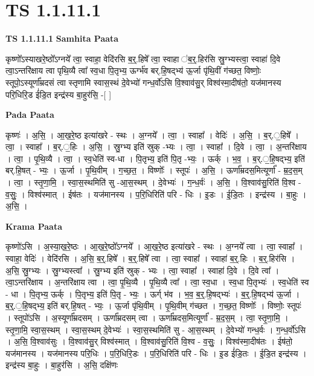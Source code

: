 \documentclass[17pt]{extarticle}
\begin{document}
\section{ TS 1.1.11.1 }

\textbf{TS 1.1.11.1 } \newline
\textbf{Samhita Paata} \newline

कृष्णो᳚ऽस्याखरे॒ष्ठो᳚ऽग्नये᳚ त्वा॒ स्वाहा॒ वेदि॑रसि ब॒र्॒.हिषे᳚ त्वा॒ स्वाहा ॑ब॒र्॒.हिर॑सि स्रु॒ग्भ्यस्त्वा॒ स्वाहा॑ दि॒वे त्वा॒ऽन्तरि॑क्षाय त्वा पृथि॒व्यै त्वा᳚ स्व॒धा पि॒तृभ्य॒ ऊर्ग्भ॑व बर्.हि॒षद्भ्य॑  ऊ॒र्जा पृ॑थि॒वीं ग॑च्छत॒ विष्णोः॒ स्तूपो॒ऽस्यूर्णा᳚म्रदसं त्वा स्तृणामि स्वास॒स्थं दे॒वेभ्यो॑ गन्ध॒र्वो॑ऽसि वि॒श्वाव॑सु॒र् विश्व॑स्मा॒दीष॑तो॒ यज॑मानस्य परि॒धिरि॒ड ई॑डि॒त इन्द्र॑स्य बा॒हुर॑सि॒ -[ ] \newline

\textbf{Pada Paata} \newline

कृष्णः॑ । अ॒सि॒ । आ॒ख॒रे॒ष्ठ इत्या॑खरे - स्थः । अ॒ग्नये᳚ । त्वा॒ । स्वाहा᳚ । वेदिः॑ । अ॒सि॒ । ब॒र्.॒हिषे᳚ । त्वा॒ । स्वाहा᳚ । ब॒र्.॒हिः । अ॒सि॒ । स्रु॒ग्भ्य इति॑ स्रुक् -भ्यः । त्वा॒ । स्वाहा᳚ । दि॒वे । त्वा॒ । अ॒न्तरि॑क्षाय । त्वा॒ । पृ॒थि॒व्यै । त्वा॒ । स्व॒धेति॑ स्व-धा । पि॒तृभ्य॒ इति॑ पि॒तृ -भ्यः॒ । ऊर्क् । भ॒व॒ । ब॒र्.॒हि॒षद्भ्य॒ इति॑ बर्.हि॒षत् - भ्यः॒ । ऊ॒र्जा । पृ॒थि॒वीम् । ग॒च्छ॒त॒ । विष्णोः᳚ । स्तूपः॑ । अ॒सि॒ । ऊर्णा᳚म्रदस॒मित्यूर्णा᳚ - म्र॒द॒स॒म् । त्वा॒ । स्तृ॒णा॒मि॒ । स्वा॒स॒स्थमिति॑ सु -आ॒स॒स्थम् । दे॒वेभ्यः॑ । ग॒न्ध॒र्वः॑ । अ॒सि॒ । वि॒श्वाव॑सु॒रिति॑ वि॒श्व - व॒सुः॒ । विश्व॑स्मात् । ईष॑तः । यज॑मानस्य । प॒रि॒धिरिति॑ परि - धिः । इ॒डः । ई॒डि॒तः । इन्द्र॑स्य । बा॒हुः । अ॒सि॒ ।  \newline


\textbf{Krama Paata} \newline

कृष्णो॑ऽसि । अ॒स्या॒ख॒रे॒ष्ठः । आ॒ख॒रे॒ष्ठो᳚ऽग्नये᳚ । आ॒ख॒रे॒ष्ठ इत्या॑खरे - स्थः । अ॒ग्नये᳚ त्वा । त्वा॒ स्वाहा᳚ । स्वाहा॒ वेदिः॑ । वेदि॑रसि । अ॒सि॒ ब॒र्॒.हिषे᳚ । ब॒र्॒.हिषे᳚ त्वा । त्वा॒ स्वाहा᳚ । स्वाहा॑ ब॒र्॒.हिः । ब॒र्॒.हिर॑सि । अ॒सि॒ स्रु॒ग्भ्यः । स्रु॒ग्भ्यस्त्वा᳚ । स्रु॒ग्भ्य इति॑ स्रुक् - भ्यः । त्वा॒ स्वाहा᳚ । स्वाहा॑ दि॒वे । दि॒वे त्वा᳚ । त्वा॒ऽन्तरि॑क्षाय । अ॒न्तरि॑क्षाय त्वा । त्वा॒ पृ॒थि॒व्यै । पृ॒थि॒व्यै त्वा᳚ । त्वा॒ स्व॒धा । स्व॒धा पि॒तृभ्यः॑ । स्व॒धेति॑ स्व - धा । पि॒तृभ्य॒ ऊर्क् । पि॒तृभ्य॒ इति॑ पि॒तृ - भ्यः॒ । ऊर्ग् भ॑व । भ॒व॒ ब॒॒र्॒.हि॒षद्भ्यः॑ । ब॒॒र्॒.हि॒षद्भ्य॑ ऊ॒र्जा । ब॒र्॒.॒हि॒षद्भ्य॒ इति॑ बर्.हि॒षत् - भ्यः॒ । ऊ॒र्जा पृ॑थि॒वीम् । पृ॒थि॒वीम् ग॑च्छत । ग॒च्छ॒त॒ विष्णोः᳚ । विष्णोः॒ स्तूपः॑ । स्तूपो॑ऽसि । अ॒स्यूर्णा᳚म्रदसम् । 
ऊर्णा᳚म्रदसम् त्वा । ऊर्णा᳚म्रदस॒मित्यूर्णा᳚ - म्र॒द॒स॒म् । त्वा॒ स्तृ॒णा॒मि॒ । स्तृ॒णा॒मि॒ स्वा॒स॒स्थम् । स्वा॒स॒स्थम् दे॒वेभ्यः॑ । स्वा॒स॒स्थमिति॑ सु - आ॒स॒स्थम् । दे॒वेभ्यो॑ गन्ध॒र्वः । ग॒न्ध॒र्वो॑ऽसि । अ॒सि॒ वि॒श्वाव॑सुः । वि॒श्वाव॑सु॒र् विश्व॑स्मात् । वि॒श्वाव॑सु॒रिति॑ वि॒श्व - व॒सुः॒ । विश्व॑स्मा॒दीष॑तः । ईष॑तो॒ यज॑मानस्य । यज॑मानस्य परि॒धिः । प॒रि॒धिरि॒डः । प॒रि॒धिरिति॑ परि - धिः । इ॒ड ई॑डि॒तः । ई॒डि॒त इन्द्र॑स्य । इन्द्र॑स्य बा॒हुः । बा॒हुर॑सि । अ॒सि॒ दक्षि॑णः \newline
\end{document}
